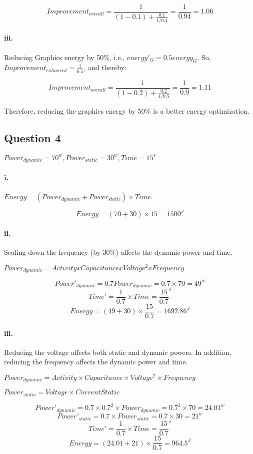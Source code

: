 \documentclass[11pt]{article}
\newcommand{\q}[1]{\subsection*{Question {#1}}}
\renewcommand{\part}[1]{\paragraph*{{#1}.}}
\begin{document}
\[
Improvement_{overall} = \frac{1}{(1-0.1) + \frac{0.1}{1/0.4}} = 
\frac{1}{0.94} = 1.06
\]

\part{iii} Reducing Graphics energy by 50\%, i.e., $energy'_{G} = 0.5 energy_{G}$. 
So, $Improvement_{enhanced} = \frac{1}{0.5}$, and thereby:

\[
Improvement_{overall} = \frac{1}{(1-0.2) + \frac{0.2}{1/0.5}} = 
\frac{1}{0.9} = 1.11
\]

Therefore, reducing the graphics energy by 50\% is a better energy optimization.

\q{4} $Power_{dynamic} = 70^w,  Power_{static} = 30^w,  Time = 15^s$

\part{i} $Energy = (Power_{dynamic} + Power_{static}) \times Time$.

\[
Energy = (70 + 30) \times 15 = 1500 ^J
\]

\part{ii} Scaling down the frequency (by 30\%) affects the dynamic power and time. 

$Power_{dynamic} = Activity x Capacitance x Voltage^2 x Frequency$

\[
Power'_{dynamic} = 0.7 Power_{dynamic} = 0.7 \times 70 = 49^w
\]
\[
Time' = \frac{1}{0.7} \times Time = \frac{15}{0.7}^s
\]
\[
Energy = (49 + 30) \times \frac{15}{0.7} = 1692.86 ^J
\]

\part{iii} Reducing the voltage affects both static and dynamic powers. In addition,  
reducing the frequency affects the dynamic power and time. 

$Power_{dynamic} = Activity \times Capacitance \times Voltage^2 
\times Frequency$

$Power_{static} = Voltage \times CurrentStatic$

\[
Power'_{dynamic} = 0.7 \times 0.7^2 \times Power_{dynamic} = 
0.7^3 \times 70 = 24.01^w
\]
\[
Power'_{static} = 0.7 \times Power_{static} = 0.7 \times 30 = 21^w
\]
\[
Time' = \frac{1}{0.7} \times Time = \frac{15}{0.7}^s
\]
\[
Energy = (24.01 + 21) \times \frac{15}{0.7} = 964.5^J 
\]
\end{document}
